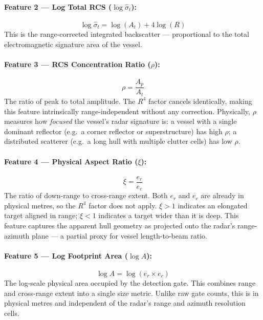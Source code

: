 \documentclass[journal]{IEEEtran}
\begin{document}
\paragraph{Feature 2 — Log Total RCS ($\log\hat{\sigma}_t$):}
\begin{equation}
  \log\hat{\sigma}_t = \log(A_t) + 4\log(R)
  \label{eq:logtotal}
\end{equation}
This is the range-corrected integrated backscatter — proportional to
the total electromagnetic signature area of the vessel.

\paragraph{Feature 3 — RCS Concentration Ratio ($\rho$):}
\begin{equation}
  \rho = \frac{A_p}{A_t}
  \label{eq:rcs_conc}
\end{equation}
The ratio of peak to total amplitude. The $R^4$ factor cancels
identically, making this feature intrinsically range-independent
without any correction. Physically, $\rho$ measures how \emph{focused}
the vessel's radar signature is: a vessel with a single dominant
reflector (e.g.\ a corner reflector or superstructure) has high $\rho$;
a distributed scatterer (e.g.\ a long hull with multiple clutter
cells) has low $\rho$.

\paragraph{Feature 4 — Physical Aspect Ratio ($\xi$):}
\begin{equation}
  \xi = \frac{e_r}{e_c}
  \label{eq:aspect}
\end{equation}
The ratio of down-range to cross-range extent. Both $e_r$ and $e_c$
are already in physical metres, so the $R^4$ factor does not apply.
$\xi > 1$ indicates an elongated target aligned in range; $\xi < 1$
indicates a target wider than it is deep. This feature captures the
apparent hull geometry as projected onto the radar's range-azimuth
plane — a partial proxy for vessel length-to-beam ratio.

\paragraph{Feature 5 — Log Footprint Area ($\log A$):}
\begin{equation}
  \log A = \log(e_r \times e_c)
  \label{eq:footprint}
\end{equation}
The log-scale physical area occupied by the detection gate. This
combines range and cross-range extent into a single size metric. Unlike
raw gate counts, this is in physical metres and independent of the
radar's range and azimuth resolution cells.
\end{document}
